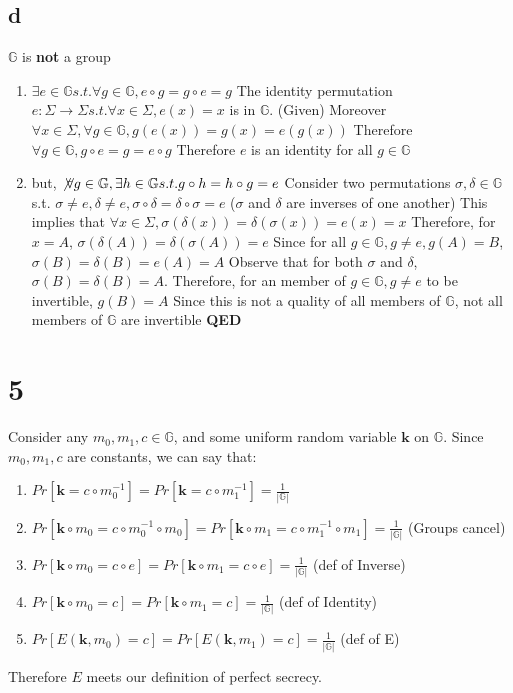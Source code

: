 \documentclass[]{article}
\begin{document}
\subsection{d}
$\mathbb{G}$ is \textbf{not} a group
\begin{enumerate}
	\item $\exists e \in \mathbb{G} s.t. \forall g \in \mathbb{G}, e \circ g = g \circ e = g$
		\subitem The identity permutation $e: \Sigma \rightarrow \Sigma s.t. \forall x \in \Sigma, e(x) = x$ is in $\mathbb{G}$. (Given)
		\subitem Moreover $\forall x \in \Sigma, \forall g \in \mathbb{G}, g(e(x)) = g(x) = e(g(x))$
		\subitem Therefore $\forall g \in \mathbb{G}, g \circ e = g = e \circ g$
		\subitem Therefore $e$ is an identity for all $g \in \mathbb{G}$
	\item but, $\not \forall g \in \mathbb{G}, \exists h \in \mathbb{G} s.t. g \circ h = h \circ g = e$
		\subitem Consider two permutations $\sigma, \delta \in \mathbb{G}$ s.t. $\sigma \neq e, \delta \neq e, \sigma \circ \delta = \delta \circ \sigma  = e$ ($\sigma$ and $\delta$ are inverses of one another)
		\subitem This implies that $\forall x \in \Sigma, \sigma(\delta(x)) = \delta(\sigma(x)) = e(x) = x$
		\subitem Therefore, for $x = A$, $\sigma(\delta(A)) = \delta(\sigma(A)) = e$
		\subitem Since for all $g \in \mathbb{G}, g \neq e, g(A) = B$,  $\sigma(B) = \delta(B) = e(A) = A$
		\subitem Observe that for both $\sigma$ and $\delta$, $\sigma(B) = \delta(B) = A$.
		\subitem Therefore, for an member of $g \in \mathbb{G}, g \neq e$ to be invertible, $g(B) = A$
		\subitem Since this is not a quality of all members of $\mathbb{G}$, not all members of $\mathbb{G}$ are invertible
		\subitem \textbf{QED}
\end{enumerate}

\section{5}
Consider any $m_0, m_1, c \in \mathbb{G}$, and some uniform random variable $\textbf{k}$ on $\mathbb{G}$. Since $m_0, m_1, c$ are constants, we can say that:
\begin{enumerate}
	\item $Pr[\textbf{k} = c \circ m_0^{-1}] = Pr[\textbf{k} = c \circ m_1^{-1}] = \frac{1}{|\mathbb{G}|}$
	\item $Pr[\textbf{k} \circ m_0 = c \circ m_0^{-1} \circ m_0] = Pr[\textbf{k} \circ m_1 = c \circ m_1^{-1} \circ m_1] = \frac{1}{|\mathbb{G}|}$ (Groups cancel)
	\item $Pr[\textbf{k} \circ m_0 = c \circ e] = Pr[\textbf{k} \circ m_1 = c \circ e] = \frac{1}{|\mathbb{G}|}$ (def of Inverse)
	\item $Pr[\textbf{k} \circ m_0 = c] = Pr[\textbf{k} \circ m_1 = c] = \frac{1}{|\mathbb{G}|}$ (def of Identity)
	\item $Pr[E(\textbf{k}, m_0) = c] = Pr[E(\textbf{k}, m_1) = c] = \frac{1}{|\mathbb{G}|}$ (def of E)
\end{enumerate}
Therefore $E$ meets our definition of perfect secrecy.
\end{document}
